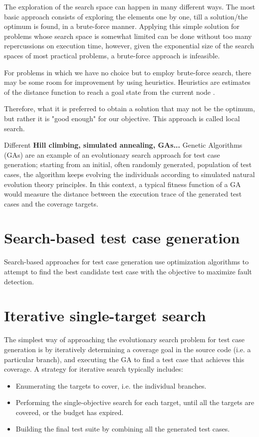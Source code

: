 The exploration of the search space can happen in many different ways. The most basic approach consists of exploring the elements one by one, till a solution/the optimum is found, in a brute-force manner. Applying this simple solution for problems whose search space is somewhat limited can be done without too many repercussions on execution time, however, given the exponential size of the search spaces of most practical problems, a brute-force approach is infeasible. 

For problems in which we have no choice but to employ brute-force search, there may be some room for improvement by using heuristics. Heuristics are estimates of the distance function to reach a goal state from the current node \cite{HeuristicSearch}.


Therefore, what it is preferred to obtain a solution that may not be the optimum, but rather it is "good enough" for our objective. This approach is called local search.




Different 
\textbf{Hill climbing, simulated annealing, GAs...}
Genetic Algorithms (GAs) are an example of an
evolutionary search approach for test case generation; starting from an initial, often randomly generated, population of 
test cases, the algorithm keeps evolving the individuals according to simulated natural evolution theory principles.
In this context, a typical fitness function of a GA would measure the distance between the execution trace of the generated test cases
and the coverage targets.


\section{Search-based test case generation}
Search-based approaches for test case generation use optimization algorithms to attempt to find 
the best candidate test case with the objective to maximize fault detection. 


\section{Iterative single-target search}
The simplest way of approaching the evolutionary search problem for test case generation is by iteratively determining a coverage goal in the source code (i.e. a particular branch), and executing the GA to find a test case that achieves this coverage. 
A strategy for iterative search typically includes:
\begin{itemize}
    \item Enumerating the targets to cover, i.e. the individual branches.
    \item Performing the single-objective search for each target, until all the targets are covered, or the budget has expired.
    \item Building the final test suite by combining all the generated test cases.
\end{itemize}


